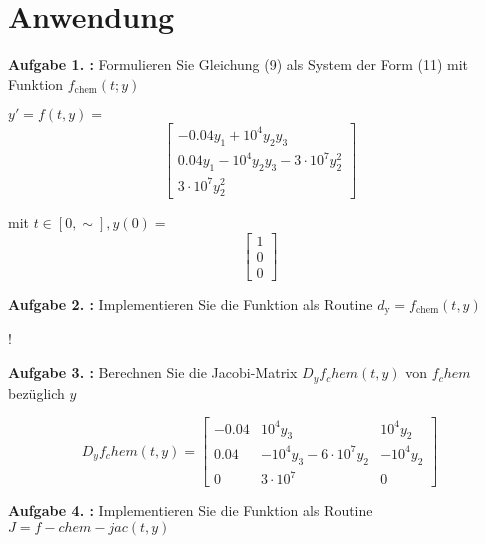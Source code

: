 \section{Anwendung}
\begin{mybox}
	\textbf{Aufgabe 1. :} Formulieren Sie Gleichung (9) als System der Form (11) mit Funktion $f_{\mathrm{chem}}(t; y)$
\end{mybox}


$y' = f(t,y) = $
\begin{equation}
\begin{bmatrix}
	-0.04y_1 + 10^4y_2y_3 \\
	0.04y_1-10^4y_2y_3-3\cdot 10^7y^2_2 \\
	3 \cdot 10^7y^2_2 
\end{bmatrix}  
\end{equation}


mit $ t\in [0,\sim], y(0) = $ 
\begin{equation}
\begin{bmatrix}
	1 \\
	0 \\
	0
\end{bmatrix}
\end{equation}
\begin{mybox}
	\textbf{Aufgabe 2. :}  Implementieren Sie die Funktion als Routine $ d_\mathrm{y} = f_{\mathrm{chem}}(t,y) $
\end{mybox}


!

\begin{mybox}
	\textbf{Aufgabe 3. :}	Berechnen Sie die Jacobi-Matrix $ D_yf_chem(t,y) $ von $ f_chem $ bezüglich $ y $
\end{mybox}
 


 

\begin{equation}
	D_yf_chem(t,y) =
\begin{bmatrix}
	-0.04 & 10^4y_3 & 10^4y_2 \\
	0.04 & -10^4y_3-6\cdot 10^7y_2 & -10^4y_2 \\
	0 & 3\cdot 10^7 & 0 
\end{bmatrix}
\end{equation}

\begin{mybox}
	\textbf{Aufgabe 4. :}	Implementieren Sie die Funktion als Routine $ J = f-chem-jac(t,y) $
\end{mybox}
 
